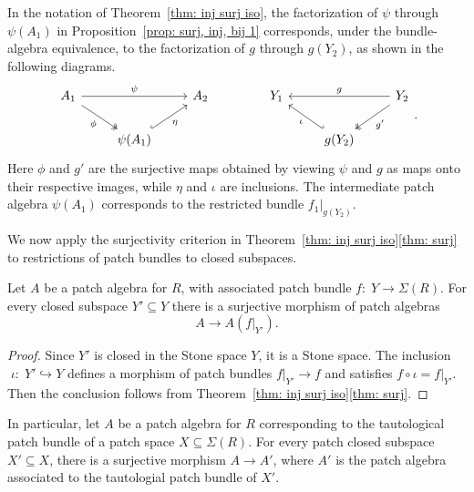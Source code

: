 \documentclass[11pt]{amsart}
\begin{document}
\begin{remark}\label{rem: geometric factorization}
In the notation of Theorem~\ref{thm: inj surj iso}, the factorization of $\psi$ through $\psi(A_1)$ in Proposition~\ref{prop: surj, inj, bij 1} corresponds, under the bundle-algebra equivalence, to the factorization of $g$ through $g(Y_2)$, as shown in the following diagrams.
    \[\begin{tikzcd}
	{A_1} && {A_2} \\
	& {\psi(A_1)}
	\arrow["\psi", from=1-1, to=1-3]
	\arrow["\phi"', two heads, from=1-1, to=2-2]
	\arrow["\eta"', hook, from=2-2, to=1-3]
\end{tikzcd}\qquad \qquad\begin{tikzcd}
	 {Y_1} && {Y_2} \\
	& {g(Y_2)}
	\arrow["g"', from=1-3, to=1-1]
	\arrow["{g'}", two heads, from=1-3, to=2-2]
	\arrow["\iota", hook', from=2-2, to=1-1]
\end{tikzcd}.\]
Here $\phi$ and $g'$ are the surjective maps obtained by viewing $\psi$ and $g$ as maps onto their respective images, while $\eta$ and $\iota$ are inclusions. The intermediate patch algebra $\psi(A_1)$ corresponds to the restricted bundle $f_1|_{g(Y_2)}$.
\end{remark}

We now apply the surjectivity criterion in Theorem~\ref{thm: inj surj iso}\ref{thm: surj} to restrictions of patch
bundles to closed subspaces.

\begin{corollary}\label{cor: inclusion of Stone spaces}
    Let $A$ be a patch algebra for $R$, with associated patch bundle
$f\colon\; Y\to\Sigma(R)$. For every closed subspace $Y' \subseteq Y$ there is a 
 surjective morphism of patch algebras \[A\longrightarrow A(f|_{Y'}).\]
\end{corollary}
\begin{proof}
Since $Y'$ is closed in the Stone space $Y$, it is a Stone space.
The inclusion $\;\iota\colon\; Y'\hookrightarrow Y$ defines a morphism of patch
bundles $f|_{Y'}\to f$ and satisfies $f\circ\iota=f|_{Y'}$.
Then the conclusion follows from
Theorem~\ref{thm: inj surj iso}\ref{thm: surj}.
\end{proof}


In particular, let $A$ be a patch algebra for $R$ corresponding to the tautological patch bundle of a patch space $X\subseteq\Sigma(R)$. For every patch closed subspace $X'\subseteq X$, there is a
surjective morphism $A\to A'$, where $A'$ is the patch algebra associated to the tautologial patch bundle of $X'$.
\end{document}
